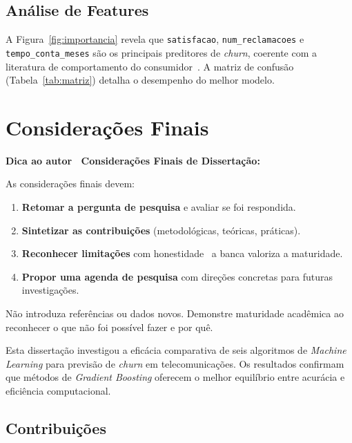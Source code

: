 \documentclass[
    12pt,
    oneside,
    a4paper,
    english,
    brazilian
    ]{abntex2}
\numberwithin{equation}{chapter}
\newenvironment{dica}{%
    \par\medskip
    \color{blue!60!black}\small\itshape
}{%
    \par\medskip
}
\begin{document}
\section{Análise de Features}

A Figura~\ref{fig:importancia} revela que \texttt{satisfacao}, \texttt{num\_reclamacoes} e \texttt{tempo\_conta\_meses} são os principais preditores de \textit{churn}, coerente com a literatura de comportamento do consumidor~\cite{provost2013}. A matriz de confusão (Tabela~\ref{tab:matriz}) detalha o desempenho do melhor modelo.



\chapter{Considerações Finais}

\begin{dica}
\noindent\textbf{Dica ao autor \textemdash\ Considerações Finais de Dissertação:}

As considerações finais devem:
\begin{enumerate}
    \item \textbf{Retomar a pergunta de pesquisa} e avaliar se foi respondida.
    \item \textbf{Sintetizar as contribuições} (metodológicas, teóricas, práticas).
    \item \textbf{Reconhecer limitações} com honestidade \textemdash\ a banca valoriza a maturidade.
    \item \textbf{Propor uma agenda de pesquisa} com direções concretas para futuras investigações.
\end{enumerate}
Não introduza referências ou dados novos. Demonstre maturidade acadêmica ao reconhecer o que não foi possível fazer e por quê.
\end{dica}

Esta dissertação investigou a eficácia comparativa de seis algoritmos de \textit{Machine Learning} para previsão de \textit{churn} em telecomunicações. Os resultados confirmam que métodos de \textit{Gradient Boosting} oferecem o melhor equilíbrio entre acurácia e eficiência computacional.

\section{Contribuições}
\end{document}
